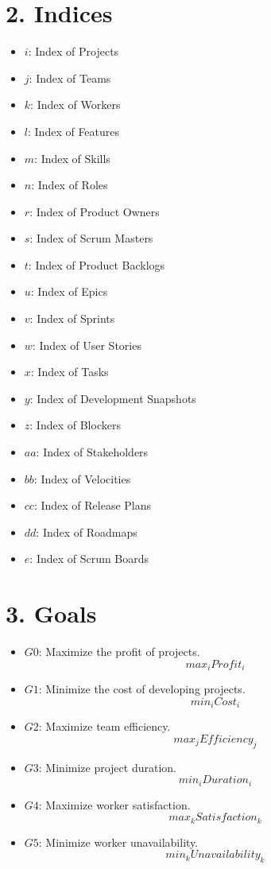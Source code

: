 \documentclass{article}
\begin{document}
\section*{2. Indices}
\begin{itemize}
    \item $i$: Index of Projects
    \item $j$: Index of Teams
    \item $k$: Index of Workers
    \item $l$: Index of Features
    \item $m$: Index of Skills
    \item $n$: Index of Roles
    \item $r$: Index of Product Owners
    \item $s$: Index of Scrum Masters
    \item $t$: Index of Product Backlogs
    \item $u$: Index of Epics
    \item $v$: Index of Sprints
    \item $w$: Index of User Stories
    \item $x$: Index of Tasks
    \item $y$: Index of Development Snapshots
    \item $z$: Index of Blockers
    \item $aa$: Index of Stakeholders
    \item $bb$: Index of Velocities
    \item $cc$: Index of Release Plans
    \item $dd$: Index of Roadmaps
    \item $e$: Index of Scrum Boards
\end{itemize}

\section*{3. Goals}
\begin{itemize}
    \item $G0$: Maximize the profit of projects.
        \[
        max_{i} Profit_i
        \]
    \item $G1$: Minimize the cost of developing projects.
        \[
        min_{i} Cost_i
        \]
    \item $G2$: Maximize team efficiency.
        \[
        max_{j} Efficiency_j
        \]
    \item $G3$: Minimize project duration.
        \[
        min_{i} Duration_i
        \]
    \item $G4$: Maximize worker satisfaction.
        \[
        max_{k} Satisfaction_k
        \]
    \item $G5$: Minimize worker unavailability.
        \[
        min_{k} Unavailability_k
        \]
\end{itemize}
\end{document}
